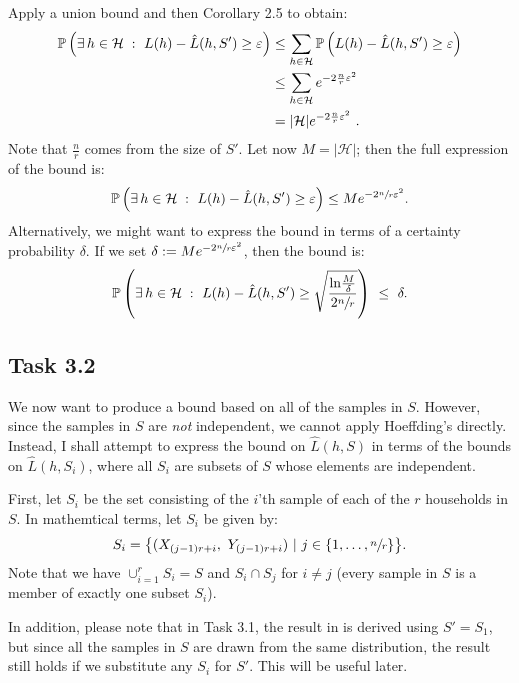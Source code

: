 Apply a union bound and then Corollary 2.5 to obtain:
\begin{align*}
  \mathbb P\left(\exists\, h \in \mathcal H\; :\  L(h) - \hat{L}(h, S') \geq \varepsilon
  \right)
  &\leq \sum_{h \in \mathcal H} \mathbb P\left(L(h) - \hat{L}(h, S') \geq \varepsilon
  \right)\\
  &\leq \sum_{h \in \mathcal H} e^{-2\frac{n}{r}\varepsilon^2}\\
  &= |\mathcal H| e^{-2\frac{n}{r}\varepsilon^2}\ .
\end{align*}
Note that $\tfrac{n}{r}$ comes from the size of $S'$. Let now $M = |\mathcal
H|$; then the full expression of the bound is:
\begin{align}
  \mathbb P\left(\exists\, h \in \mathcal H\; :\  L(h) - \hat{L}(h, S') \geq \varepsilon
  \right)
  \leq M e^{-2\sfrac{n}{r}\varepsilon^2}.\label{eq:3.1}
\end{align}
Alternatively, we might want to express the bound in terms of a certainty
probability $\delta$. If we set $\delta := Me^{-2\sfrac{n}{r}\varepsilon^2}$, then the
bound is:
\begin{align*}
  \mathbb P \left(\exists\, h \in \mathcal H\; :\  L(h) - \hat{L}(h, S') \geq
  \sqrt{\frac{\text{ln}\frac{M}{\delta}}{2 \sfrac{n}{r}}}\right)
  \ \leq \ \delta.
\end{align*}

\subsection{Task 3.2}
\label{sec:3.2}

We now want to produce a bound based on all of the samples in $S$. However,
since the samples in $S$ are \textit{not} independent, we cannot apply
Hoeffding's directly. Instead, I shall attempt to express the bound on $\hat
L(h, S)$ in terms of the bounds on $\hat L(h, S_i)$, where all $S_i$ are subsets
of $S$ whose elements are independent.

First, let $S_i$ be the set consisting of the $i$'th sample of each 
of the $r$ households in $S$. In mathemtical terms, let $S_i$ be given by:
\begin{align*}
  S_i = \big\{(X_{(j - 1)r + i},\ Y_{(j - 1)r + i})\ |\ j \in \{1,\dots,
  \sfrac{n}{r}\}\big\}.
\end{align*}
Note that we have $\cup_{i = 1}^r S_i = S$ and $S_i \cap S_j$ for $i \neq j$
(every sample in $S$ is a member of exactly one subset  $S_i$).

In addition, please note that in Task 3.1, the result in  is
derived using $S' = S_1$, but since all the samples in $S$ are drawn from the
same distribution, the result still holds if we substitute any $S_i$ for $S'$.
This will be useful later.

